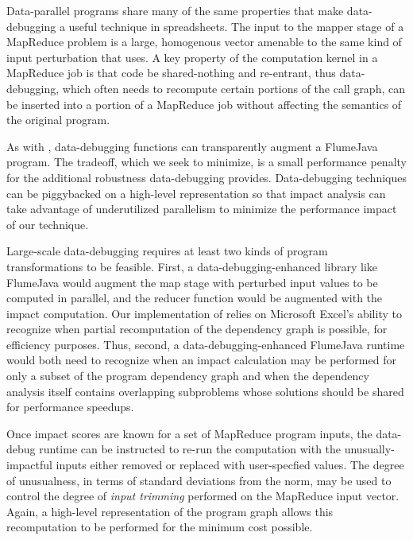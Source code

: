 Data-parallel programs share many of the same properties that make data-debugging a useful technique in spreadsheets.  The input to the mapper stage of a MapReduce problem is a large, homogenous vector amenable to the same kind of input perturbation that \checkcell{} uses.  A key property of the computation kernel in a MapReduce job is that code be shared-nothing and re-entrant, thus data-debugging, which often needs to recompute certain portions of the call graph, can be inserted into a portion of a MapReduce job without affecting the semantics of the original program.

As with \checkcell, data-debugging functions can transparently augment a FlumeJava program.  The tradeoff, which we seek to minimize, is a small performance penalty for the additional robustness data-debugging provides. Data-debugging techniques can be piggybacked on a high-level representation so that impact analysis can take advantage of underutilized parallelism to minimize the performance impact of our technique.

Large-scale data-debugging requires at least two kinds of program transformations to be feasible.  First, a data-debugging-enhanced library like FlumeJava would augment the map stage with perturbed input values to be computed in parallel, and the reducer function would be augmented with the impact computation.  Our implementation of \checkcell relies on Microsoft Excel's ability to recognize when partial recomputation of the dependency graph is possible, for efficiency purposes.  Thus, second, a data-debugging-enhanced FlumeJava runtime would both need to recognize when an impact calculation may be performed for only a subset of the program dependency graph and when the dependency analysis itself contains overlapping subproblems whose solutions should be shared for performance speedups.

Once impact scores are known for a set of MapReduce program inputs, the data-debug runtime can be instructed to re-run the computation with the unusually-impactful inputs either removed or replaced with user-specfied values.  The degree of unusualness, in terms of standard deviations from the norm, may be used to control the degree of \emph{input trimming} performed on the MapReduce input vector.  Again, a high-level representation of the program graph allows this recomputation to be performed for the minimum cost possible.
